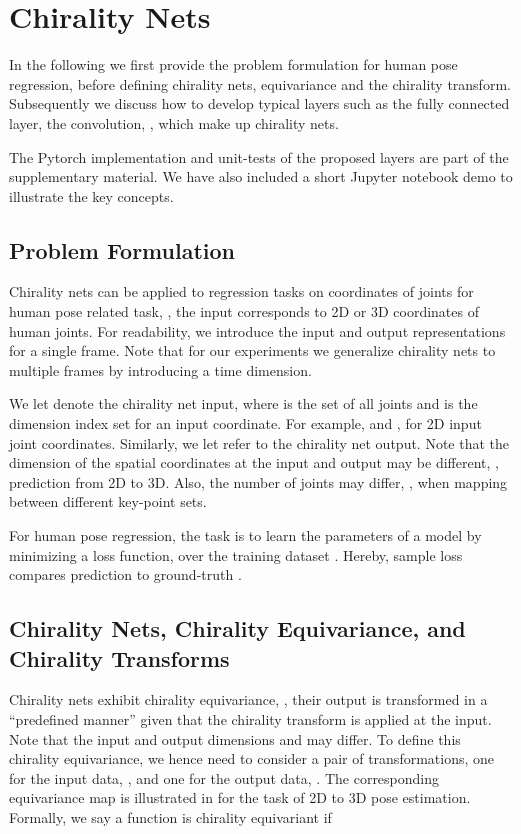 \documentclass{article}
\begin{document}
\section{Chirality Nets}
\label{sec:app}

In the following we first provide the  problem formulation for human pose regression, before defining   chirality nets,  equivariance and the chirality transform. Subsequently we discuss how to develop typical layers such as the fully connected layer, the convolution, \etc, which make up chirality nets. 

The Pytorch implementation and unit-tests of the proposed layers are part of the supplementary material. We have also included a short Jupyter notebook demo to illustrate the key concepts.

\subsection{Problem Formulation}
Chirality nets can be applied to regression tasks on  coordinates of joints for human pose related task, \ie, the input corresponds to 2D or 3D coordinates of human joints. For readability, we introduce the input and output representations for a single frame. Note that for our experiments we generalize chirality nets  to multiple frames by introducing a time dimension. 

We let  denote the chirality net input, where  is the set of all joints and  is the dimension index set for an input coordinate. For example,  and , for 2D  input joint coordinates.  Similarly, we let   refer to the chirality net output. Note that the dimension of the spatial coordinates at the input and output may be different, \eg, prediction from 2D to 3D. Also, the  number of joints may differ, \eg, when mapping between different key-point sets. 

For human pose regression, the task is to learn the parameters  of a model  by minimizing a loss function,  over the training dataset . Hereby, sample loss  compares prediction  to ground-truth .

\subsection{Chirality Nets, Chirality Equivariance, and Chirality Transforms}\label{seq:eq_def}

Chirality nets exhibit chirality equivariance, \ie, their output is transformed in a ``predefined manner'' given that the chirality transform is applied at the input. Note that the input and output dimensions  and  may differ. To define this chirality equivariance, we hence  need to consider a pair of transformations, one for the input data, , and one for the output data, . The corresponding equivariance map is illustrated in  for the task of 2D to 3D pose estimation. Formally,  we say a function  is chirality equivariant \wrt  if 
\end{document}
